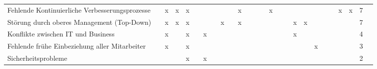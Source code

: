 \begin{sidewaystable}[ht]
\begin{tabular}{|p{6cm}|c|c|c|c|c|c|c|c|c|c|c|c|c|c|c|c|c|c|c|c|c|c|c|c|c|}
		Fehlende Kontinuierliche Verbesserungsprozesse  &                   & x                  & x                  & x                    &                    &                   &                   &                      &                    & x                    &                  &                  &                     & x                &                 &                      &                    &                 &                  &                  &                        & x                    & x                      & 7  \\
		Störung durch oberes Management (Top-Down)      &                   & x                  & x                  & x                    &                    &                   &                   & x                    &                    & x                    &                  &                  &                     &                  &                 &                      & x                  & x               &                  &                  &                        &                      &                        & 7  \\
		Konflikte zwischen IT und Business              &                   & x                  &                    & x                    &                    & x                 &                   &                      &                    &                      &                  &                  &                     &                  &                 &                      & x                  &                 &                  &                  &                        &                      &                        & 4  \\
		Fehlende frühe Einbeziehung aller Mitarbeiter   &                   & x                  &                    & x                    &                    &                   &                   &                      &                    &                      &                  &                  &                     &                  &                 &                      &                    &                 & x                &                  &                        &                      &                        & 3  \\
		Sicherheitsprobleme                             &                   &                    &                    & x                    &                    & x                 &                   &                      &                    &                      &                  &                  &                     &                  &                 &                      &                    &                 &                  &                  &                        &                      &                        & 2  \\

\end{tabular}
\end{sidewaystable}

